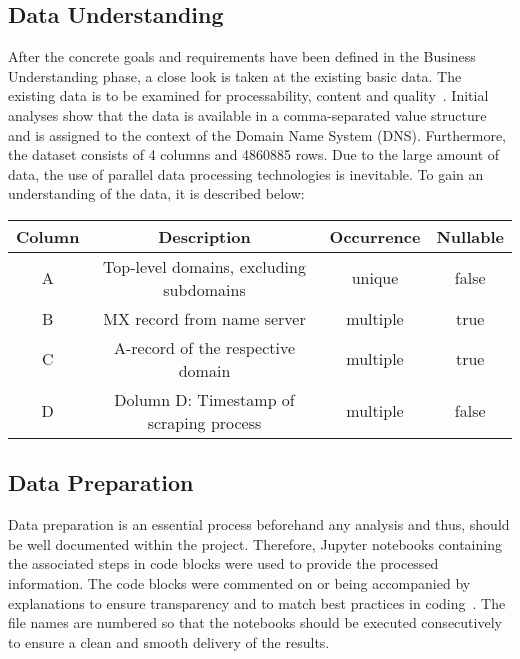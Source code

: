 \subsection{Data Understanding}\label{subsec:dataunderstanding}
After the concrete goals and requirements have been defined in the Business Understanding phase, a close look is taken at the existing basic data.
The existing data is to be examined for processability, content and quality~\autocite[cf.][]{Semmelmann.2020}.
Initial analyses show that the data is available in a comma-separated value structure and is assigned to the context of the Domain Name System (DNS).
Furthermore, the dataset consists of 4 columns and 4860885 rows.
Due to the large amount of data, the use of parallel data processing technologies is inevitable.
To gain an understanding of the data, it is described below:

\begin{center}
    \begin{tabular}{||c c c c||} 
    \hline
    Column & Description & Occurrence & Nullable \\ [0.5ex] 
    \hline\hline
    A & Top-level domains, excluding subdomains & unique & false \\ 
    \hline
    B & MX record from name server & multiple & true \\
    \hline
    C & A-record of the respective domain & multiple & true \\
    \hline
    D & Dolumn D: Timestamp of scraping process & multiple & false
   \end{tabular}
   \end{center}



\subsection{Data Preparation}\label{subsec:datapreparation}
Data preparation is an essential process beforehand any analysis and thus, should be well documented within the project.
Therefore, Jupyter notebooks containing the associated steps in code blocks were used to provide the processed information.
The code blocks were commented on or being accompanied by explanations to ensure transparency and to match best practices in coding~\autocite[cf.][]{Kosourova.2021}.
The file names are numbered so that the notebooks should be executed consecutively to ensure a clean and smooth delivery of the results.

